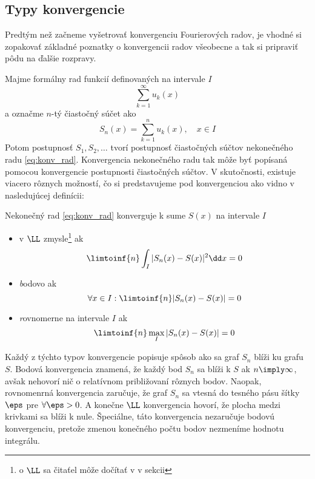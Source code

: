 \subsection{Typy konvergencie}

Predtým než začneme vyšetrovať konvergenciu Fourierových radov, je
vhodné si zopakovať základné poznatky o konvergencii radov všeobecne
a tak si pripraviť pôdu na ďalšie rozpravy.

Majme formálny rad funkcií definovaných na intervale $I$
\begin{equation}
    \sum_{k=1}^{\infty} u_k(x)
    \label{eq:konv_rad}
\end{equation}
a označme $n$-tý čiastočný súčet ako
\begin{equation}
    S_n(x) = \sum_{k=1}^{n} u_k(x), \quad x\in I
    \label{eq:konv_sucet}
\end{equation}
Potom postupnosť $S_1,S_2, \dots$ tvorí postupnosť čiastočných súčtov
nekonečného radu \eqref{eq:konv_rad}. Konvergencia nekonečného radu tak
môže byť popísaná pomocou konvergencie postupnosti čiastočných súčtov.
V skutočnosti, existuje viacero rôznych možností, čo si predstavujeme
pod konvergenciou ako vidno v nasledujúcej definícii:

\begin{definicia}
    Nekonečný rad \eqref{eq:konv_rad} konverguje k sume $S(x)$ na
    intervale $I$
    \begin{itemize}
        \item {v $\LL$ zmysle\footnote{o $\LL$ sa čitaťel môže dočítať v
        v sekcii \todo{}}} ak 
            \begin{equation}
                \limtoinf{n} \int_I |S_n(x) - S(x)|^2 \dd x = 0
            \end{equation}
        \item {\emph bodovo} ak 
            \begin{equation}
                \forall x\in I: \limtoinf{n} |S_n(x) - S(x)| = 0
            \end{equation}
        \item {\emph rovnomerne na intervale $I$} ak 
            \begin{equation}
                \limtoinf{n} \max_I |S_n(x) - S(x)| = 0
            \end{equation}        
    \end{itemize}
\end{definicia}
Každý z týchto typov konvergencie popisuje spôsob ako sa graf $S_n$
blíži ku grafu $S$.
Bodová konvergencia znamená, že každý bod $S_n$ sa blíži k $S$ ak
$n\imply\infty$, avšak nehovorí nič o relatívnom približovaní rôznych
bodov. Naopak, rovnomenrná konvergencia zaručuje, že graf $S_n$ sa
vtesná do tesného pásu šítky $\eps$ pre $\forall \eps>0$.
A konečne $\LL$ konvergencia hovorí, že plocha medzi
krivkami sa blíži k nule. Špeciálne, táto konvergencia nezaručuje
bodovú konvergenciu, pretože zmenou konečného počtu bodov nezmeníme
hodnotu integrálu.

